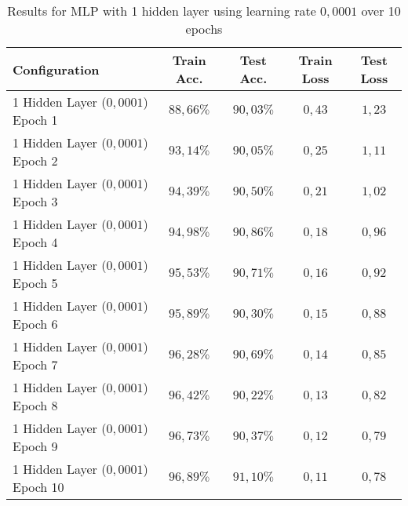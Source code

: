 \documentclass[a4paper]{article}
\begin{document}
\begin{table}[h!]
\centering
\begin{tabular}{|l|c|c|c|c|}
\hline
\textbf{Configuration} & \textbf{Train Acc.} & \textbf{Test Acc.} & \textbf{Train Loss} & \textbf{Test Loss} \\
\hline
1 Hidden Layer ($0{,}0001$) Epoch 1 & $88{,}66\%$ & $90{,}03\%$ & $0{,}43$ & $1{,}23$ \\
1 Hidden Layer ($0{,}0001$) Epoch 2 & $93{,}14\%$ & $90{,}05\%$ & $0{,}25$ & $1{,}11$ \\
1 Hidden Layer ($0{,}0001$) Epoch 3 & $94{,}39\%$ & $90{,}50\%$ & $0{,}21$ & $1{,}02$ \\
1 Hidden Layer ($0{,}0001$) Epoch 4 & $94{,}98\%$ & $90{,}86\%$ & $0{,}18$ & $0{,}96$ \\
1 Hidden Layer ($0{,}0001$) Epoch 5 & $95{,}53\%$ & $90{,}71\%$ & $0{,}16$ & $0{,}92$ \\
1 Hidden Layer ($0{,}0001$) Epoch 6 & $95{,}89\%$ & $90{,}30\%$ & $0{,}15$ & $0{,}88$ \\
1 Hidden Layer ($0{,}0001$) Epoch 7 & $96{,}28\%$ & $90{,}69\%$ & $0{,}14$ & $0{,}85$ \\
1 Hidden Layer ($0{,}0001$) Epoch 8 & $96{,}42\%$ & $90{,}22\%$ & $0{,}13$ & $0{,}82$ \\
1 Hidden Layer ($0{,}0001$) Epoch 9 & $96{,}73\%$ & $90{,}37\%$ & $0{,}12$ & $0{,}79$ \\
1 Hidden Layer ($0{,}0001$) Epoch 10 & $96{,}89\%$ & $91{,}10\%$ & $0{,}11$ & $0{,}78$ \\
\hline
\end{tabular}
\caption{Results for MLP with 1 hidden layer using learning rate $0{,}0001$ over 10 epochs}
\label{tab:one_hidden_layer_results}
\end{table}
\end{document}
